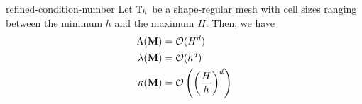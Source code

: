 \begin{Corollary}{refined-condition-number}
  Let $\mathbb T_h$ be a shape-regular mesh with cell sizes ranging
  between the minimum $h$ and the maximum $H$. Then, we have
  \begin{align*}
    \Lambda(\mathbf M) &= \mathcal O(H^{d}) \\
    \lambda(\mathbf M) &= \mathcal O(h^{d}) \\
    \kappa(\mathbf M) &= \mathcal O\left(\left(\frac Hh\right)^{d}\right)
  \end{align*}
\end{Corollary}

